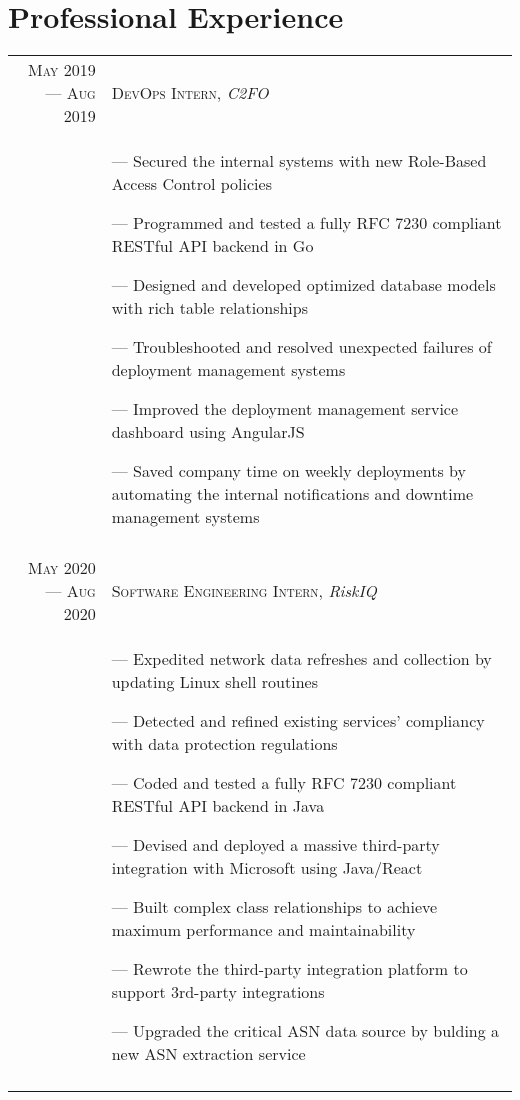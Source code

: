\documentclass[a4paper, 10pt]{article}
\begin{document}
\section{Professional Experience}
\begin{tabular}{r|p{12cm}}

	\textsc{May 2019 --- Aug 2019} & \textsc{DevOps Intern}, \emph{C2FO}                                                         \\&\footnotesize{
		--- Secured the internal systems with new Role-Based Access Control policies

		--- Programmed and tested a fully RFC 7230 compliant RESTful API backend in Go

		--- Designed and developed optimized database models with rich table relationships

		--- Troubleshooted and resolved unexpected failures of deployment management systems

		--- Improved the deployment management service dashboard using AngularJS

		--- Saved company time on weekly deployments by automating the internal notifications and downtime management systems
	}                                                                                                                            \\\multicolumn{2}{c}{}\\

	\textsc{May 2020 --- Aug 2020} & \textsc{Software Engineering Intern}, \emph{RiskIQ}                                         \\&\footnotesize{
		--- Expedited network data refreshes and collection by updating Linux shell routines

		--- Detected and refined existing services' compliancy with data protection regulations

		--- Coded and tested a fully RFC 7230 compliant RESTful API backend in Java

		--- Devised and deployed a massive third-party integration with Microsoft using Java/React

		--- Built complex class relationships to achieve maximum performance and maintainability

		--- Rewrote the third-party integration platform to support 3rd-party integrations

		--- Upgraded the critical ASN data source by bulding a new ASN extraction service
	}                                                                                                                            \\\multicolumn{2}{c}{}\\


\end{tabular}
\end{document}
